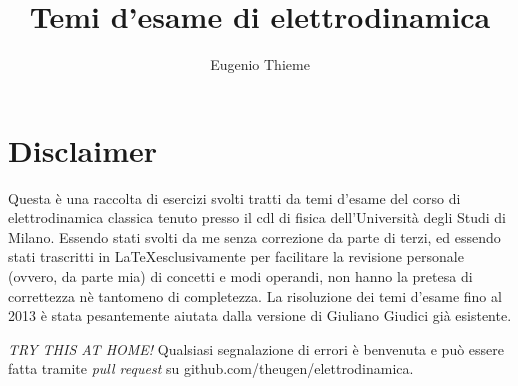 \documentclass[a4paper,11pt]{book}
\begin{document}
\author{Eugenio Thieme}
\title{Temi d'esame di elettrodinamica}
\maketitle
\tableofcontents

\chapter*{Disclaimer}
Questa è una raccolta di esercizi svolti tratti da temi d'esame del corso
di elettrodinamica classica tenuto presso il cdl di fisica dell'Università
degli Studi di Milano.
Essendo stati svolti da me senza correzione da parte di terzi, ed essendo
stati trascritti in \LaTeX esclusivamente per facilitare la revisione personale (ovvero, da parte mia) di
concetti e modi operandi, non hanno la pretesa di correttezza nè tantomeno
di completezza. 
La risoluzione dei temi d'esame fino al 2013 è stata pesantemente aiutata dalla
versione di Giuliano Giudici già esistente.

\emph{TRY THIS AT HOME!}
Qualsiasi segnalazione di errori è benvenuta e può essere fatta tramite 
\emph{pull request} su github.com/theugen/elettrodinamica.


\end{document}

